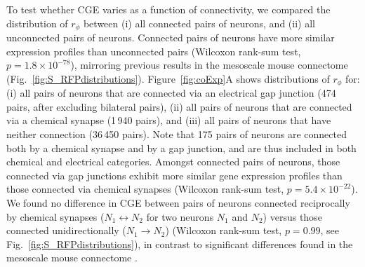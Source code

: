 \documentclass[10pt,letterpaper]{article}
\begin{document}
To test whether CGE varies as a function of connectivity, we compared the distribution of $r_\phi$ between
(i) all connected pairs of neurons, and
(ii) all unconnected pairs of neurons.
Connected pairs of neurons have more similar expression profiles than unconnected pairs (Wilcoxon rank-sum test, $p = 1.8 \times 10^{-78}$), mirroring previous results in the mesoscale mouse connectome \cite{Fulcher:2016ck} (Fig.~\ref{fig:S_RFPdistributions}).
Figure~\ref{fig:coExp}A shows distributions of $r_\phi$ for:
(i) all pairs of neurons that are connected via an electrical gap junction (474 pairs, after excluding bilateral pairs),
(ii) all pairs of neurons that are connected via a chemical synapse (1\,940 pairs), and
(iii) all pairs of neurons that have neither connection (36\,450 pairs).
Note that 175 pairs of neurons are connected both by a chemical synapse and by a gap junction, and are thus included in both chemical and electrical categories.
Amongst connected pairs of neurons, those connected via gap junctions exhibit more similar gene expression profiles than those connected via chemical synapses (Wilcoxon rank-sum test, $p = 5.4 \times 10^{-22}$).
We found no difference in CGE between pairs of neurons connected reciprocally by chemical synapses ($N_1 \leftrightarrow N_2$ for two neurons $N_1$ and $N_2$) versus those connected unidirectionally ($N_1 \rightarrow N_2$) (Wilcoxon rank-sum test, $p = 0.99$, see Fig.~\ref{fig:S_RFPdistributions}), in contrast to significant differences found in the mesoscale mouse connectome \cite{Fulcher:2016ck}.
\end{document}
